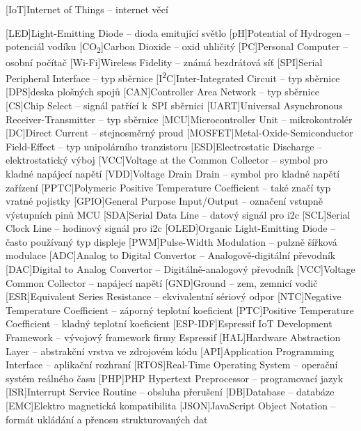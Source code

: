 \cleardoublepage
\chapter*{\listofabbrevname}
{}

\begin{acronym}[iotasdasdsd]

	[IoT]{Internet of Things -- internet věcí}

	[LED]{Light-Emitting Diode -- dioda emitující světlo}
	[pH]{Potential of Hydrogen -- potenciál vodíku}
	[CO\textsubscript{2}]{Carbon Dioxide -- oxid uhličitý}
	[PC]{Personal Computer -- osobní počítač}
	[Wi-Fi]{Wireless Fidelity -- známá bezdrátová síť}
	[SPI]{Serial Peripheral Interface -- typ sběrnice}
	[I\textsuperscript{2}C]{Inter-Integrated Circuit -- typ sběrnice}
	[DPS]{deska plošných spojů}
	[CAN]{Controller Area Network -- typ sběrnice}
	[CS]{Chip Select -- signál patřící k~SPI sběrnici}
	[UART]{Universal Asynchronous Receiver-Transmitter -- typ sběrnice}
	[MCU]{Microcontroller Unit -- mikrokontrolér}
	[DC]{Direct Current -- stejnosměrný proud}
	[MOSFET]{Metal-Oxide-Semiconductor Field-Effect -- typ unipolárního tranzistoru}
	[ESD]{Electrostatic Discharge -- elektrostatický výboj}
	[VCC]{Voltage at the Common Collector -- symbol pro kladné napájecí napětí}
	[VDD]{Voltage Drain Drain -- symbol pro kladné napětí zařízení}
	[PPTC]{Polymeric Positive Temperature Coefficient -- také značí typ vratné pojistky}
	[GPIO]{General Purpose Input/Output -- označení vstupně výstupních pinů MCU}
	[SDA]{Serial Data Line -- datový signál pro \acs{i2c}}
	[SCL]{Serial Clock Line -- hodinový signál pro \acs{i2c}}
	[OLED]{Organic Light-Emitting Diode -- často používaný typ displeje}
	[PWM]{Pulse-Width Modulation -- pulzně šířková modulace}
	[ADC]{Analog to Digital Convertor -- Analogově-digitální převodník}
	[DAC]{Digital to Analog Convertor -- Digitálně-analogový převodník}
	[VCC]{Voltage Common Collector -- napájecí napětí}
	[GND]{Ground -- zem, zemnicí vodič}
	[ESR]{Equivalent Series Resistance -- ekvivalentní sériový odpor}
	[NTC]{Negative Temperature Coefficient -- záporný teplotní koeficient}
	[PTC]{Positive Temperature Coefficient -- kladný teplotní koeficient}
	[ESP-IDF]{Espressif IoT Development Framework -- vývojový framework firmy Espressif}
	[HAL]{Hardware Abstraction Layer -- abstrakční vrstva ve zdrojovém kódu}
	[API]{Application Programming Interface -- aplikační rozhraní}
	[RTOS]{Real-Time Operating System -- operační systém reálného času}
	[PHP]{PHP Hypertext Preprocessor -- programovací jazyk}
	[ISR]{Interrupt Service Routine -- obsluha přerušení}
	[DB]{Database -- databáze}
	[EMC]{Elektro magnetická kompatibilita}
	[JSON]{JavaScript Object Notation -- formát ukládání a přenosu strukturovaných dat}

\end{acronym}
